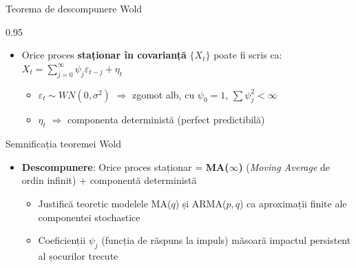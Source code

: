\documentclass[9pt, aspectratio=169, t]{beamer}
\begin{document}
\begin{frame}{Teorema de descompunere Wold}
    \begin{cminipage}{0.95\textwidth}
        \small
        \begin{thm}[Wold, 1938]
            \begin{itemize}\setlength{\itemsep}{0pt}
                \item Orice proces \textbf{staționar în covarianță} $\{X_t\}$ poate fi scris ca:
                $X_t = \sum_{j=0}^{\infty} \psi_j \varepsilon_{t-j} + \eta_t$
                \begin{itemize}
                    \item $\varepsilon_t \sim WN(0, \sigma^2)$ $\Rightarrow$ zgomot alb, cu $\psi_0 = 1$, $\sum \psi_j^2 < \infty$
                    \item $\eta_t$ $\Rightarrow$ componenta deterministă (perfect predictibilă)
                \end{itemize}
            \end{itemize}
        \end{thm}

        \begin{exampleblock}{Semnificația teoremei Wold}
            \begin{itemize}\setlength{\itemsep}{0pt}
                \item \textbf{Descompunere}: Orice proces staționar = \textbf{MA($\infty$)} (\textit{Moving Average} de ordin infinit) + componentă deterministă
                \begin{itemize}
                    \item Justifică teoretic modelele MA($q$) și ARMA($p,q$) ca aproximații finite ale componentei stochastice
                    \item Coeficienții $\psi_j$ (funcția de răspuns la impuls) măsoară impactul persistent al șocurilor trecute
                \end{itemize}
            \end{itemize}
        \end{exampleblock}
    \end{cminipage}
\end{frame}
\end{document}
